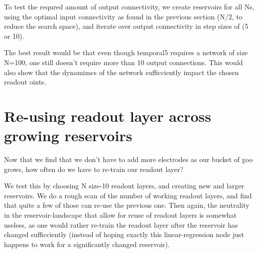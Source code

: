 To test the requred amount of output connectivity,
we create reservoirs for all Ns, using the optimal input connectivity as found in the previous section (N/2, to reduce the search space), and iterate over output connectivity in step sizes of (5 or 10).

The best result would be that even though temporal5 requires a network of size N=100,
one still doesn't require more than 10 output connections.
This would also show that the dynamimcs of the network sufficciently impact the chosen readout oints.

\section{Re-using readout layer across growing reservoirs}

Now that we find that we don't have to add more electrodes as our bucket of goo grows,
how often do we have to re-train our readout layer?

We test this by choosing N size-10 readout layers, and creating new and larger reservoirs.
We do a rough scan of the number of working readout layers, and find that quite a few of those can re-use the previous one.
Then again, the neutrality in the reservoir-landscape that allow for reuse of readout layers is somewhat useless, as one would rather re-train the readout layer after the reservoir has changed sufficciently (instead of hoping exactly this linear-regression node just happens to work for a significantly changed reservoir).
